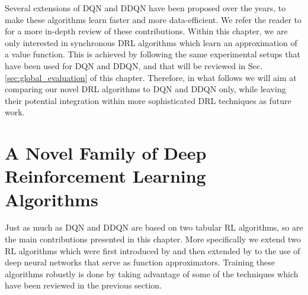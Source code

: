 Several extensions of DQN and DDQN have been proposed over the years, to make these algorithms learn faster and more data-efficient. We refer the reader to \cite{li2017deep} for a more in-depth review of these contributions. Within this chapter, we are only interested in synchronous DRL algorithms which learn an approximation of a value function. This is achieved by following the same experimental setups that have been used for DQN and DDQN, and that will be reviewed in Sec. \ref{sec:global_evaluation} of this chapter. Therefore, in what follows we will aim at comparing our novel DRL algorithms to DQN and DDQN only, while leaving their potential integration within more sophisticated DRL techniques as future work.

\section{A Novel Family of Deep Reinforcement Learning Algorithms}
\label{sec:dqv_family}

Just as much as DQN and DDQN are based on two tabular RL algorithms, so are the main contributions presented in this chapter. More specifically we extend two RL algorithms which were first introduced by \citet{wiering2005qv} and then extended by \citet{wiering2009qv} to the use of deep neural networks that serve as function approximators. Training these algorithms robustly is done by taking advantage of some of the techniques which have been reviewed in the previous section.

